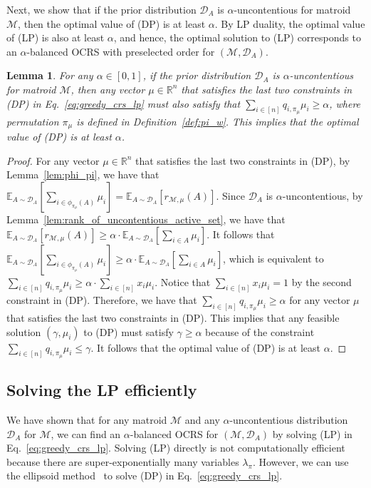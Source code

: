 \documentclass[11pt]{article}
\newcommand{\D}{\mathcal D}
\def \E {\mathbb{E}}
\newcommand{\M}{{\mathcal M}}
\newcommand{\R}{{\mathbb R}}
\newtheorem{lemma}[theorem]{Lemma}
\begin{document}
Next, we show that if the prior distribution $\D_A$ is $\alpha$-uncontentious for matroid $\M$, then the optimal value of (DP) is at least $\alpha$. By LP duality, the optimal value of (LP) is also at least $\alpha$, and hence, the optimal solution to (LP) corresponds to an $\alpha$-balanced OCRS with preselected order for $(\M,\D_A)$.
\begin{lemma}\label{lem:greedy_crs_lp}
For any $\alpha\in[0,1]$, if the prior distribution $\D_A$ is $\alpha$-uncontentious for matroid $\M$, then any vector $\mu\in\R^n$ that satisfies the last two constraints in (DP) in Eq.~\eqref{eq:greedy_crs_lp} must also satisfy that $\sum_{i\in[n]} q_{i,\pi_{\mu}}\mu_i\ge\alpha$, where permutation $\pi_{\mu}$ is defined in Definition~\ref{def:pi_w}. This implies that the optimal value of (DP) is at least $\alpha$.
\end{lemma}
\begin{proof}
For any vector $\mu\in\R^n$ that satisfies the last two constraints in (DP), by Lemma~\ref{lem:phi_pi}, we have that $\E_{A\sim\D_A}[\sum_{i\in\phi_{\pi_{\mu}}(A)} \mu_i]=\E_{A\sim\D_A}[r_{\M,\mu}(A)]$. Since $\D_A$ is $\alpha$-uncontentious, by Lemma~\ref{lem:rank_of_uncontentious_active_set}, we have that $\E_{A\sim\D_A}[r_{\M,\mu}(A)]\ge\alpha\cdot\E_{A\sim\D_A}[\sum_{i\in A} \mu_i]$. It follows that $\E_{A\sim\D_A}[\sum_{i\in\phi_{\pi_{\mu}}(A)} \mu_i]\ge\alpha\cdot\E_{A\sim\D_A}[\sum_{i\in A} \mu_i]$, which is equivalent to $\sum_{i\in[n]} q_{i,\pi_{\mu}}\mu_i\ge \alpha\cdot\sum_{i\in[n]}x_i\mu_i$. Notice that $\sum_{i\in[n]}x_i\mu_i=1$ by the second constraint in (DP). Therefore, we have that $\sum_{i\in[n]} q_{i,\pi_{\mu}}\mu_i\ge\alpha$ for any vector $\mu$ that satisfies the last two constraints in (DP). This implies that any feasible solution $(\gamma,\mu_i)$ to (DP) must satisfy $\gamma\ge\alpha$ because of the constraint $\sum_{i\in[n]} q_{i,\pi_{\mu}}\mu_i\le\gamma$. It follows that the optimal value of (DP) is at least $\alpha$.
\end{proof}

\subsection{Solving the LP efficiently}\label{subsec:solving_greedy_crs_lp}
We have shown that for any matroid $\M$ and any $\alpha$-uncontentious distribution $\D_A$ for $\M$, we can find an $\alpha$-balanced OCRS for $(\M,\D_A)$ by solving (LP) in Eq.~\eqref{eq:greedy_crs_lp}. Solving (LP) directly is not computationally efficient because there are super-exponentially many variables $\lambda_{\pi}$. However, we can use the ellipsoid method~\citep{grotschel2012geometric} to solve (DP) in Eq.~\eqref{eq:greedy_crs_lp}.
\end{document}
